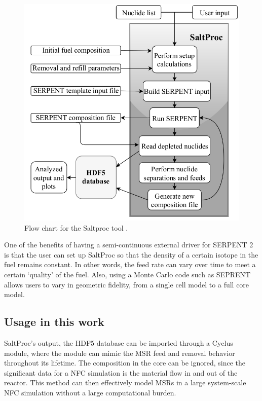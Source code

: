 \begin{figure}[htbp!]
	\begin{center}
		\includegraphics[scale=0.3]{./images/saltproc.png}
	\end{center}
	\caption{Flow chart for the Saltproc tool
		\cite{rykhlevskii_online_2017}.}
	\label{fig:saltproc}
\end{figure}


One of the benefits of having a semi-continuous external driver for
SERPENT 2 is that the user can set up SaltProc so that the density
of a certain isotope in the fuel remains constant. In other words,
the feed rate can vary over time to meet a certain `quality' of the fuel.
Also, using a Monte Carlo code such as SEPRENT allows users to vary
in geometric fidelity, from a single cell model to a full core model.

\subsection{Usage in this work}
SaltProc's output, the HDF5 database can be imported through a Cyclus
module, where the module can mimic the \gls{MSR} feed and removal
behavior throughout its lifetime. The composition in the core can
be ignored, since the significant data for a \gls{NFC} simulation
is the material flow in and out of the reactor. This method can
then effectively model \glspl{MSR} in a large system-scale \gls{NFC}
simulation without a large computational burden.